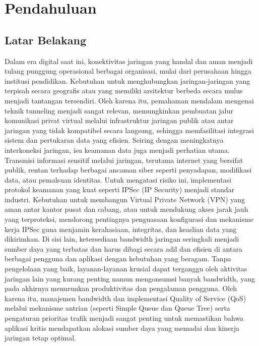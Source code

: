 \section{Pendahuluan}
\subsection{Latar Belakang}
Dalam era digital saat ini, konektivitas jaringan yang handal dan aman menjadi tulang punggung operasional berbagai organisasi, mulai dari perusahaan hingga institusi pendidikan. Kebutuhan untuk menghubungkan jaringan-jaringan yang terpisah secara geografis atau yang memiliki arsitektur berbeda secara mulus menjadi tantangan tersendiri. Oleh karena itu, pemahaman mendalam mengenai teknik tunneling menjadi sangat relevan, memungkinkan pembuatan jalur komunikasi privat virtual melalui infrastruktur jaringan publik atau antar jaringan yang tidak kompatibel secara langsung, sehingga memfasilitasi integrasi sistem dan pertukaran data yang efisien.
Seiring dengan meningkatnya interkoneksi jaringan, isu keamanan data juga menjadi perhatian utama. Transmisi informasi sensitif melalui jaringan, terutama internet yang bersifat publik, rentan terhadap berbagai ancaman siber seperti penyadapan, modifikasi data, atau pemalsuan identitas. Untuk mengatasi risiko ini, implementasi protokol keamanan yang kuat seperti IPSec (IP Security) menjadi standar industri. Kebutuhan untuk membangun Virtual Private Network (VPN) yang aman antar kantor pusat dan cabang, atau untuk mendukung akses jarak jauh yang terproteksi, mendorong pentingnya penguasaan konfigurasi dan mekanisme kerja IPSec guna menjamin kerahasiaan, integritas, dan keaslian data yang dikirimkan.
Di sisi lain, ketersediaan bandwidth jaringan seringkali menjadi sumber daya yang terbatas dan harus dibagi secara adil dan efisien di antara berbagai pengguna dan aplikasi dengan kebutuhan yang beragam. Tanpa pengelolaan yang baik, layanan-layanan krusial dapat terganggu oleh aktivitas jaringan lain yang kurang penting namun mengonsumsi banyak bandwidth, yang pada akhirnya menurunkan produktivitas dan pengalaman pengguna. Oleh karena itu, manajemen bandwidth dan implementasi Quality of Service (QoS) melalui mekanisme antrian (seperti Simple Queue dan Queue Tree) serta pengaturan prioritas trafik menjadi sangat penting untuk memastikan bahwa aplikasi kritis mendapatkan alokasi sumber daya yang memadai dan kinerja jaringan tetap optimal.
